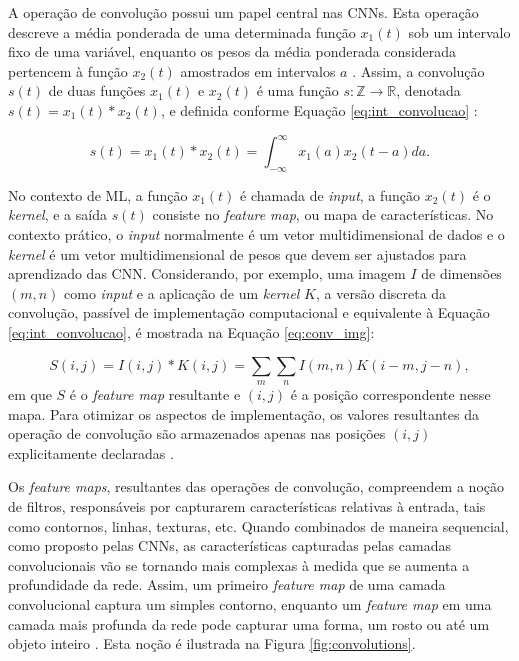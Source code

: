 A operação de convolução possui um papel central nas CNNs. Esta operação descreve a média ponderada de uma determinada função $x_1(t)$ sob um intervalo fixo de uma variável, enquanto os pesos da média ponderada considerada pertencem à função $x_2(t)$ amostrados em intervalos $a$ \cite{bracewell1986fourier}. Assim, a convolução $s(t)$ de duas funções $x_1(t)$ e $x_2(t)$ é uma função $s: \mathds{Z} \rightarrow \mathds{R}$, denotada $s(t) = x_1(t) * x_2(t)$, e definida conforme Equação \ref{eq:int_convolucao} \cite{lathi2006sinais}:

\begin{equation}\label{eq:int_convolucao}
s(t) = x_1(t) * x_2(t) = \int_{-\infty}^{\infty} x_1(a) x_2(t-a)da.
\end{equation}

No contexto de ML, a função $x_1(t)$ é chamada de \emph{input}, a função $x_2(t)$ é o \emph{kernel}, e a saída $s(t)$ consiste no \emph{feature map}, ou mapa de características. No contexto prático, o \emph{input} normalmente é um vetor multidimensional de dados e o \emph{kernel} é um vetor multidimensional de pesos que devem ser ajustados para aprendizado das CNN. Considerando, por exemplo, uma imagem $I$ de dimensões $(m,n)$ como \emph{input} e a aplicação de um \emph{kernel} $K$, a versão discreta da convolução, passível de implementação computacional e equivalente à Equação \ref{eq:int_convolucao}, é mostrada na Equação \ref{eq:conv_img}:

\begin{equation}
 S(i,j) = I(i,j)*K(i,j) = \sum_{m}\sum_{n}I(m,n)K(i-m,j-n),\label{eq:conv_img}
\end{equation}
em que $S$ é o \emph{feature map} resultante e $(i,j)$ é a posição correspondente nesse mapa. Para otimizar os aspectos de implementação, os valores resultantes da operação de convolução são armazenados apenas nas posições $(i,j)$ explicitamente declaradas \cite{goodfellow2016deep}.

Os \emph{feature maps}, resultantes das operações de convolução, compreendem a noção de filtros, responsáveis por capturarem características relativas à entrada, tais como contornos, linhas, texturas, etc. Quando combinados de maneira sequencial, como proposto pelas CNNs, as características capturadas pelas camadas convolucionais vão se tornando mais complexas à medida que se aumenta a profundidade da rede. Assim, um primeiro \emph{feature map} de uma camada convolucional captura um simples contorno, enquanto um \emph{feature map} em uma camada mais profunda da rede pode capturar uma forma, um rosto ou até um objeto inteiro \cite{Buduma:Livro}. Esta noção é ilustrada na Figura \ref{fig:convolutions}.

